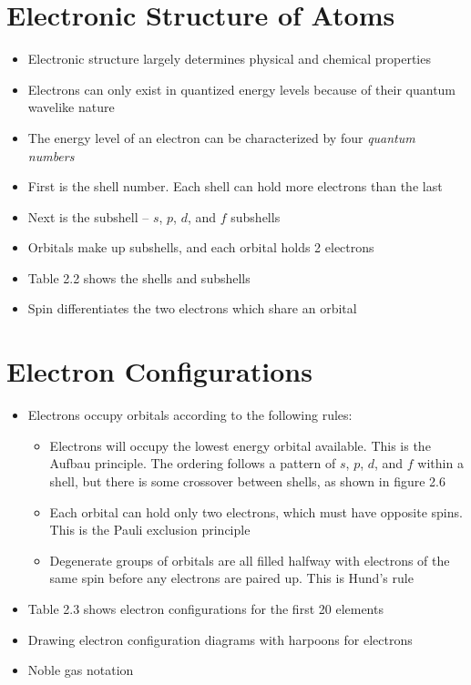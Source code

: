\documentclass[12pt, openany, letterpaper]{memoir}
\begin{document}
\section{Electronic Structure of Atoms}
\begin{itemize}
	\item Electronic structure largely determines physical and chemical properties
	\item Electrons can only exist in quantized energy levels because of their quantum wavelike nature
	\item The energy level of an electron can be characterized by four \emph{quantum numbers}
	\item First is the shell number. Each shell can hold more electrons than the last
	\item Next is the subshell -- $s$, $p$, $d$, and $f$ subshells
	\item Orbitals make up subshells, and each orbital holds 2 electrons
	\item Table 2.2 shows the shells and subshells
	\item Spin differentiates the two electrons which share an orbital	
\end{itemize}

\section{Electron Configurations}
\begin{itemize}
	\item Electrons occupy orbitals according to the following rules:
	\begin{itemize}
		\item Electrons will occupy the lowest energy orbital available. This is the Aufbau principle. The ordering follows a pattern of $s$, $p$, $d$, and $f$ within a shell, but there is some crossover between shells, as shown in figure 2.6
		\item Each orbital can hold only two electrons, which must have opposite spins. This is the Pauli exclusion principle
		\item Degenerate groups of orbitals are all filled halfway with electrons of the same spin before any electrons are paired up. This is Hund's rule
	\end{itemize}
	\item Table 2.3 shows electron configurations for the first 20 elements
	\item Drawing electron configuration diagrams with harpoons for electrons
	\item Noble gas notation
\end{itemize}
\end{document}
